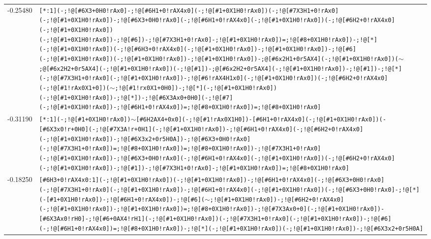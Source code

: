 \begin{longtable}{>{\baselineskip=10pt}p{} >{\baselineskip=10pt}p{}}
-0.25480 & \texttt{[*:1](-;!@[\#6X3+0H0!rAx0]-;!@[\#6H1+0!rAX4x0](-;!@[\#1+0X1H0!rAx0])(-;!@[\#7X3H1+0!rAx0](-;!@[\#1+0X1H0!rAx0])-;!@[\#6X3+0H0!rAx0](-;!@[\#6H1+0!rAX4x0](-;!@[\#1+0X1H0!rAx0])(-;!@[\#6H2+0!rAX4x0](-;!@[\#1+0X1H0!rAx0])(-;!@[\#1+0X1H0!rAx0])-;!@[\#6])-;!@[\#7X3H1+0!rAx0]-;!@[\#1+0X1H0!rAx0])=;!@[\#8+0X1H0!rAx0])-;!@[*](-;!@[\#1+0X1H0!rAx0])(-;!@[\#6H3+0!rAX4x0](-;!@[\#1+0X1H0!rAx0])-;!@[\#1+0X1H0!rAx0])-;!@[\#6](-;!@[\#1+0X1H0!rAx0])(-;!@[\#1+0X1H0!rAx0])-;!@[\#1+0X1H0!rAx0])-;@[\#6x2H1+0r5AX4](-;!@[\#1+0X1H0!rAx0])($\sim$;@[\#6x2H2+0r5AX4](-;!@[\#1+0X1H0!rAx0])(-;!@[\#1])-;@[\#6x2H2+0r5AX4](-;!@[\#1+0X1H0!rAx0])-;!@[\#1])-;!@[*](-;!@[\#7X3H1+0!rAx0](-;!@[\#1+0X1H0!rAx0])-;!@[\#6!rAX4H1x0](-;!@[\#1+0X1H0!rAx0])(-;!@[\#6H2+0!rAX4x0](-;!@[\#1!rAx0X1+0])($\sim$;!@[\#1!rx0X1+0H0])-;!@[*](-;!@[\#1+0X1H0!rAx0])(-;!@[\#1+0X1H0!rAx0])-;!@[*])-;!@[\#6X3Ax0+0H0](-;!@[\#7](-;!@[\#1+0X1H0!rAx0])-;!@[\#6H1+0!rAX4x0])=;!@[\#8+0X1H0!rAx0])=;!@[\#8+0X1H0!rAx0]} \\ 
-0.31190 & \texttt{[*:1](-;!@[\#1+0X1H0!rAx0])$\sim$[\#6H2AX4+0x0](-;!@[\#1!rAx0X1H0])-[\#6H1+0!rAX4x0](-;!@[\#1+0X1H0!rAx0])(-[\#6X3x0!r+0H0](-;!@[\#7X3A!r+0H1](-;!@[\#1+0X1H0!rAx0])-;!@[\#6H1+0!rAX4x0](-;!@[\#6H2+0!rAX4x0](-;!@[\#1+0X1H0!rAx0])-;!@[\#6X3x2+0r5H0A])-;!@[\#6X3+0H0!rAx0](-;!@[\#7X3H1+0!rAx0])=;!@[\#8+0X1H0!rAx0])=;!@[\#8+0X1H0!rAx0])-;!@[\#7X3H1+0!rAx0](-;!@[\#1+0X1H0!rAx0])-;!@[\#6X3+0H0!rAx0](-;!@[\#6H1+0!rAX4x0](-;!@[\#1+0X1H0!rAx0])(-;!@[\#6H2+0!rAX4x0](-;!@[\#1+0X1H0!rAx0])-;!@[\#1])-;!@[\#7X3H1+0!rAx0]-;!@[\#1+0X1H0!rAx0])=;!@[\#8+0X1H0!rAx0]} \\ 
-0.18250 & \texttt{[\#6H3+0!rAX4x0:1](-;!@[\#1+0X1H0!rAx0])(-;!@[\#1+0X1H0!rAx0])-;!@[\#6H1+0!rAX4x0](-;!@[\#6X3+0H0!rAx0](-;!@[\#7X3H1+0!rAx0](-;!@[\#1+0X1H0!rAx0])-;!@[\#6H1+0!rAX4x0](-;!@[\#1+0X1H0!rAx0])(-;!@[\#6X3+0H0!rAx0]-;!@[*](-[\#1+0X1H0!rAx0])-;!@[\#6H1+0!rAX4x0])-;!@[\#6]($\sim$;!@[\#1+0X1H0!rAx0])-;!@[\#6H2+0!rAX4x0](-;!@[\#1+0X1H0!rAx0])-;!@[\#1+0X1H0!rAx0])=;!@[\#8+0X1H0!rAx0])-;!@[\#7X3Ax0+0](-;!@[\#1+0X1H0!rAx0])-[\#6X3Ax0!rH0]-;!@[\#6+0AX4!rH1](-;!@[\#1+0X1H0!rAx0])(-;!@[\#7X3H1+0!rAx0](-;!@[\#1+0X1H0!rAx0])-;!@[\#6](-;!@[\#6H1+0!rAX4x0])=;!@[\#8+0X1H0!rAx0])-;!@[*](-;!@[\#1+0X1H0!rAx0])(-;!@[\#1+0X1H0!rAx0])-;!@[\#6X3x2+0r5H0A]} \\ 

\end{longtable}
